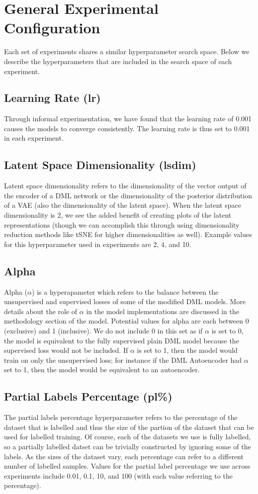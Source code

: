 \documentclass[./dissertation.tex]{subfiles}
\begin{document}
    
    
    \section{General Experimental Configuration}
    Each set of experiments shares a similar hyperparameter search space. Below we describe the hyperparameters that are included in the search space of each experiment. 
    \subsection{Learning Rate (lr)}
    Through informal experimentation, we have found that the learning rate of 0.001 causes the models to converge consistently. The learning rate is thus set to 0.001 in each experiment.
    \subsection{Latent Space Dimensionality (lsdim)}
    Latent space dimensionality refers to the dimensionality of the vector output of the encoder of a DML network or the dimensionality of the posterior distribution of a VAE (also the dimensionality of the latent space). When the latent space dimensionality is 2, we see the added benefit of creating plots of the latent representations (though we can accomplish this through using dimensionality reduction methods like tSNE for higher dimensionalities as well). Example values for this hyperparameter used in experiments are 2, 4, and 10. 
    \subsection{Alpha}
    Alpha ($\alpha$) is a hyperapameter which refers to the balance between the unsupervised and supervised losses of some of the modified DML models. More details about the role of $\alpha$ in the model implementations are discussed in the methodology section of the model. Potential values for alpha are each between 0 (exclusive) and 1 (inclusive). We do not include 0 in this set as if $\alpha$ is set to 0, the model is equivalent to the fully supervised plain DML model because the supervised loss would not be included. If $\alpha$ is set to 1, then the model would train on only the unsupervised loss; for instance if the DML Autoencoder had $\alpha$ set to 1, then the model would be equivalent to an autoencoder. 
    \subsection{Partial Labels Percentage (pl\%)}
    The partial labels percentage hyperparameter refers to the percentage of the dataset that is labelled and thus the size of the partion of the dataset that can be used for labelled training. Of course, each of the datasets we use is fully labelled, so a partially labelled datset can be trivially constructed by ignoring some of the labels. As the sizes of the dataset vary, each percentage can refer to a different number of labelled samples. Values for the partial label percentage we use across experiments include 0.01, 0.1, 10, and 100 (with each value referring to the percentage). 
\end{document}
